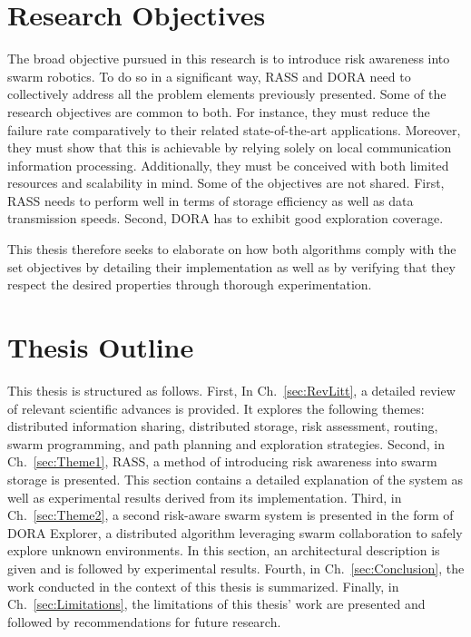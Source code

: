 \section{Research Objectives}  %
The broad objective pursued in this research is to introduce risk awareness into swarm robotics. To do so in a significant way, \ac{RASS} and \ac{DORA} need to collectively address all the problem elements previously presented. Some of the research objectives are common to both. For instance, they must reduce the failure rate comparatively to their related state-of-the-art applications. Moreover, they must show that this is achievable by relying solely on local communication information processing. Additionally, they must be conceived with both limited resources and scalability in mind. Some of the objectives are not shared. First, \ac{RASS} needs to perform well in terms of storage efficiency as well as data transmission speeds. Second, \ac{DORA} has to exhibit good exploration coverage.

This thesis therefore seeks to elaborate on how both algorithms comply with the set objectives by detailing their implementation as well as by verifying that they respect the desired properties through thorough experimentation.


\section{Thesis Outline}  %
This thesis is structured as follows. First, In Ch.~\ref{sec:RevLitt}, a detailed review of relevant scientific advances is provided. It explores the following themes: distributed information sharing, distributed storage, risk assessment, routing, swarm programming, and path planning and exploration strategies. Second, in Ch.~\ref{sec:Theme1}, RASS, a method of introducing risk awareness into swarm storage is presented. This section contains a detailed explanation of the system as well as experimental results derived from its implementation. Third, in Ch.~\ref{sec:Theme2}, a second risk-aware swarm system is presented in the form of DORA Explorer, a distributed algorithm leveraging swarm collaboration to safely explore unknown environments. In this section, an architectural description is given and is followed by experimental results. Fourth, in Ch.~\ref{sec:Conclusion}, the work conducted in the context of this thesis is summarized. Finally, in Ch.~\ref{sec:Limitations}, the limitations of this thesis' work are presented and followed by recommendations for future research.
